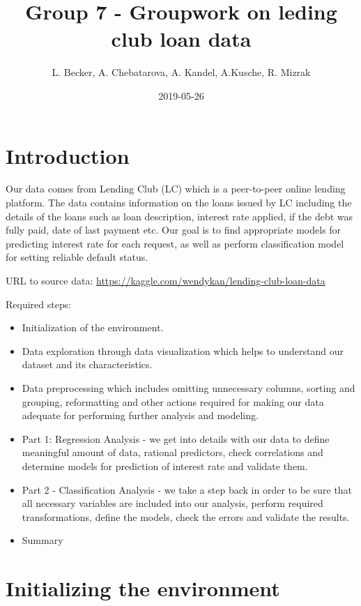 \documentclass[]{article}
\title{Group 7 - Groupwork on leding club loan data}
\author{L. Becker, A. Chebatarova, A. Kandel, A.Kusche, R. Mizrak}
\date{2019-05-26}
\begin{document}
\maketitle

\hypertarget{introduction}{%
\section{Introduction}\label{introduction}}

Our data comes from Lending Club (LC) which is a peer-to-peer online
lending platform. The data contains information on the loans issued by
LC including the details of the loans such as loan description, interest
rate applied, if the debt was fully paid, date of last payment etc. Our
goal is to find appropriate models for predicting interest rate for each
request, as well as perform classification model for setting reliable
default status.

URL to source data:
\url{https://kaggle.com/wendykan/lending-club-loan-data}

Required steps:

\begin{itemize}
\item
  Initialization of the environment.
\item
  Data exploration through data visualization which helps to understand
  our dataset and its characteristics.
\item
  Data preprocessing which includes omitting unnecessary columns,
  sorting and grouping, reformatting and other actions required for
  making our data adequate for performing further analysis and modeling.
\item
  Part 1: Regression Analysis - we get into details with our data to
  define meaningful amount of data, rational predictors, check
  correlations and determine models for prediction of interest rate and
  validate them.
\item
  Part 2 - Classification Analysis - we take a step back in order to be
  sure that all necessary variables are included into our analysis,
  perform required transformations, define the models, check the errors
  and validate the results.
\item
  Summary
\end{itemize}

\hypertarget{initializing-the-environment}{%
\section{Initializing the
environment}\label{initializing-the-environment}}
\end{document}
